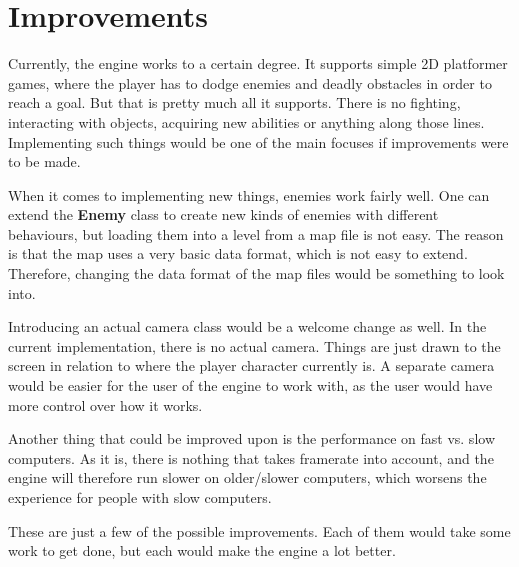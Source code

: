 \section{Improvements}
\label{04}

Currently, the engine works to a certain degree. It supports simple 2D platformer games, where the player has to dodge enemies and deadly obstacles in order to reach a goal. But that is pretty much all it supports. There is no fighting, interacting with objects, acquiring new abilities or anything along those lines. Implementing such things would be one of the main focuses if improvements were to be made.

When it comes to implementing new things, enemies work fairly well. One can extend the \textbf{Enemy} class to create new kinds of enemies with different behaviours, but loading them into a level from a map file is not easy. The reason is that the map uses a very basic data format, which is not easy to extend. Therefore, changing the data format of the map files would be something to look into.

Introducing an actual camera class would be a welcome change as well. In the current implementation, there is no actual camera. Things are just drawn to the screen in relation to where the player character currently is. A separate camera would be easier for the user of the engine to work with, as the user would have more control over how it works.

Another thing that could be improved upon is the performance on fast vs. slow computers. As it is, there is nothing that takes framerate into account, and the engine will therefore run slower on older/slower computers, which worsens the experience for people with slow computers.

These are just a few of the possible improvements. Each of them would take some work to get done, but each would make the engine a lot better.